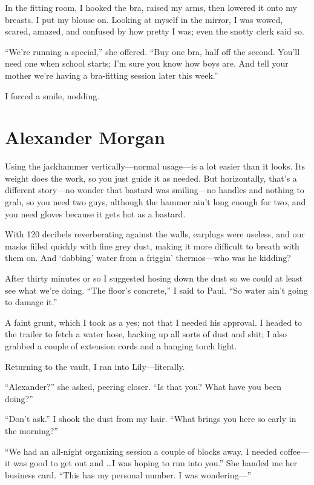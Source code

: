 In the fitting room, I hooked the bra, raised my arms, then lowered it
onto my breasts. I put my blouse on. Looking at myself in the mirror, I
was wowed, scared, amazed, and confused by how pretty I was; even the
snotty clerk said so.

``We're running a special,'' she offered. ``Buy one bra, half off the
second. You'll need one when school starts; I'm sure you know how boys
are. And tell your mother we're having a bra-fitting session later this
week.''

I forced a smile, nodding.

\chapter{Alexander Morgan}

\titlemark

Using the jackhammer vertically---normal usage---is a lot easier than it
looks. Its weight does the work, so you just guide it as needed. But
horizontally, that's a different story---no wonder that bastard was
smiling---no handles and nothing to grab, so you need two guys, although
the hammer ain't long enough for two, and you need gloves because it
gets hot as a bastard.

With 120 decibels reverberating against the walls, earplugs were
useless, and our masks filled quickly with fine grey dust, making it
more difficult to breath with them on. And `dabbing' water from a
friggin' thermos---who was he kidding?

After thirty minutes or so I suggested hosing down the dust so we could
at least see what we're doing. ``The floor's concrete,'' I said to Paul.
``So water ain't going to damage it.''

A faint grunt, which I took as a yes; not that I needed his approval. I
headed to the trailer to fetch a water hose, hacking up all sorts of
dust and shit; I also grabbed a couple of extension cords and a hanging
torch light.

Returning to the vault, I ran into Lily---literally.

``Alexander?'' she asked, peering closer. ``Is that you? What have you
been doing?''

``Don't ask.'' I shook the dust from my hair. ``What brings you here so
early in the morning?''

``We had an all-night organizing session a couple of blocks away. I
needed coffee---it was good to get out and \ldots I was hoping to run
into you.'' She handed me her business card. ``This has my personal
number. I was wondering---''

